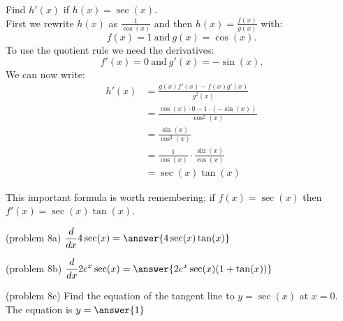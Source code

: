 \documentclass{ximera}
\begin{document}
\begin{example}[example 8]
Find $h'(x)$ if $h(x) = \sec(x).$\\
First we rewrite $h(x)$ as $\displaystyle{\frac{1}{\cos(x)}}$ 
and then $\displaystyle{h(x) = \frac{f(x)}{g(x)}}$ with:
\[f(x) = 1 \  \mbox{and} \  g(x)= \cos(x).\]
To use the quotient rule we need the derivatives:
\[f'(x) = 0 \  \mbox{and} \   g'(x) = -\sin(x).\]
We can now write: 
\begin{align*}
h'(x) &= \frac{g(x)f'(x) - f(x)g'(x)}{g^2(x)}\\
&= \frac{\cos(x)\cdot 0 - 1\cdot (-\sin(x))}{\cos^2(x)}\\
&= \frac{ \sin(x)}{\cos^2(x)} \\
&= \frac{ 1}{\cos(x)} \cdot \frac{\sin(x)}{\cos(x)}\\
&=  \sec(x) \tan(x)
\end{align*}

This important formula is worth remembering: if $f(x) = \sec(x)$ then $f'(x) =\sec(x) \tan(x)$.
\end{example}



\begin{center}
\begin{foldable}
\end{foldable}
\end{center}


\begin{problem}(problem 8a)
  $\displaystyle{\frac{d}{dx} 4\sec(x)= \answer{4\sec(x)\tan(x)}}$\\
\end{problem}

\begin{problem}(problem 8b)
  $\displaystyle{\frac{d}{dx} 2e^x \sec(x)= \answer{2e^x\sec(x)(1+\tan(x))}}$\\
\end{problem}

\begin{problem}(problem 8c)
  Find the equation of the tangent line to $y = \sec(x)$ at $x = 0$.\\
  The equation is $y = \answer{1}$
\end{problem}
\end{document}
